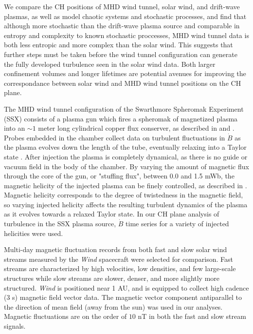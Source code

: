 \documentclass[aps,twocolumn,secnumarabic,nobalancelastpage,amsmath,amssymb,
nofootinbib]{revtex4-1}
\begin{document}
We compare the CH positions of MHD wind tunnel, solar wind, and drift-wave plasmas, as well as model chaotic systems and stochastic processes, and find that although more stochastic than the drift-wave plasma source and comparable in entropy and complexity to known stochastic proccesses, MHD wind tunnel data is both less entropic and more complex than the solar wind. This suggests that further steps must be taken before the wind tunnel configuration can generate the fully developed turbulence seen in the solar wind data. Both larger confinement volumes and longer lifetimes are potential avenues for improving the correspondance between  solar wind and MHD wind tunnel positions on the CH plane.

The MHD wind tunnel configuration of the Swarthmore Spheromak Experiment (SSX) consists of a plasma gun which fires a spheromak of magnetized plasma into an $\sim1$ meter long cylindrical copper flux conserver, as described in \cite{zhang2011} and \cite{schaffner2014}. Probes embedded in the chamber collect data on turbulent fluctuations in $\dot{B}$ as the plasma evolves down the length of the tube, eventually relaxing into a Taylor state \cite{gray2013}. After injection the plasma is completely dynamical, as there is no guide or vacuum field in the body of the chamber. By varying the amount of magnetic flux through the core of the gun, or "stuffing flux", between 0.0 and 1.5 mWb, the magnetic helicity of the injected plasma can be finely controlled, as described in \cite{schaffner2014}. Magnetic helicity corresponds to the degree of twistedness in the magnetic field, so varying injected helicity affects the resulting turbulent dynamics of the plasma as it evolves towards a relaxed Taylor state. In our CH plane analysis of turbulence in the SSX plasma source, $\dot{B}$ time series for a variety of injected helicities were used. 

 Multi-day magnetic fluctuation records from both fast and slow solar wind streams measured by the \textit{Wind} spacecraft were selected for comparison. Fast streams are characterized by high velocities, low densities, and  few large-scale structures while slow streams are slower, denser, and more slightly more structured. \textit{Wind} is positioned near 1 AU, and is equipped to collect high cadence (3 s) magnetic field vector data.   The magnetic vector component antiparallel to the direction of mean field (away from the sun) was used in our analyses. Magnetic fluctuations are on the order of $10$ nT in both the fast and slow stream signals. 
\end{document}
